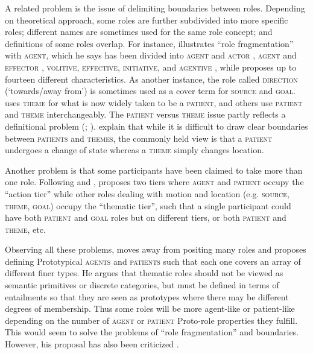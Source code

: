 \documentclass[output=paper]{langsci/langscibook}
\begin{document}
A related problem is the issue of delimiting boundaries between roles. Depending on theoretical approach, some roles are further subdivided into more specific roles; different names are sometimes used for the same role concept; and definitions of some roles overlap. For instance, \citet[553]{Dowty1991} illustrates “role fragmentation” with \textsc{agent,} which he says has been divided into \textsc{agent} and \textsc{actor} \citep{Jackendoff1983}, \textsc{agent} and \textsc{effector} \citep{VanValin1990}, \textsc{volitive}, \textsc{effective}, \textsc{initiative}, and \textsc{agentive} \citep{Cruse1973}, while \citet{Lakoff1977} proposes up to fourteen different characteristics. As another instance, the role called \textsc{direction} (‘towards/away from’) is sometimes used as a cover term for \textsc{source} and \textsc{goal.} \citet{Anderson1977} uses \textsc{theme} for what is now widely taken to be a \textsc{patient}, and others use \textsc{patient} and \textsc{theme} interchangeably. The \textsc{patient} versus \textsc{theme} issue partly reflects a definitional problem (\citealt[548-549]{Dowty1991}; \citealt[113]{Lobner2002}). \citet[5]{PalmerEtAl2010} explain that while it is difficult to draw clear boundaries between \textsc{patients} and \textsc{themes,} the commonly held view is that a \textsc{patient} undergoes a change of state whereas a \textsc{theme} simply changes location.

Another problem is that some participants have been claimed to take more than one role. Following \citet{CulicoverWilkins1986} and \citet{Talmy1985lexicalization}, \citet[395]{Jackendoff1987} proposes two tiers where \textsc{agent} and \textsc{patient} occupy the “action tier” while other roles dealing with motion and location (e.g. \textsc{source, theme, goal}) occupy the “thematic tier”, such that a single participant could have both \textsc{patient} and \textsc{goal} roles but on different tiers, or both \textsc{patient} and \textsc{theme}, etc.

 Observing all these problems, \citet{Dowty1991} moves away from positing many roles and proposes defining Prototypical \textsc{agents} and \textsc{patient}\textsc{s} such that each one covers an array of different finer types. He argues that thematic roles should not be viewed as semantic primitives or discrete categories, but must be defined in terms of entailments so that they are seen as prototypes where there may be different degrees of membership. Thus some roles will be more agent-like or patient-like depending on the number of \textsc{agent} or \textsc{patient} Proto-role properties they fulfill. This would seem to solve the problems of “role fragmentation” and boundaries. However, his proposal has also been criticized \citep{LevinHovav1996}.
\end{document}
